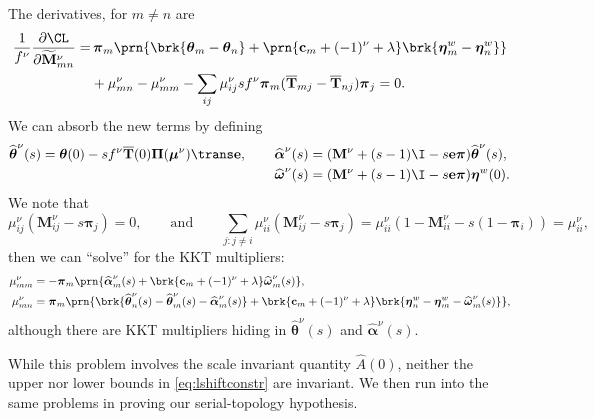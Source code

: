 \documentclass[12pt]{article}
\newcommand{\onev}{\mathbf{e}}
\newcommand{\eq}{\pib}
\newcommand{\Eq}{\boldsymbol{\Pi}}
\newcommand{\fpt}{\mathbf{T}}
\newcommand{\fptb}{\overline{\fpt}}
\newcommand{\pib}{\boldsymbol{\pi}}
\newcommand{\etw}{\boldsymbol{\eta}^w}
\newcommand{\thb}{\boldsymbol{\theta}}
\newcommand{\omb}{\boldsymbol{\omega}}
\newcommand{\alb}{\boldsymbol{\alpha}}
\newcommand{\M}{\mathbf{M}}
\newcommand{\Mh}{\widetilde{\M}}
\renewcommand{\pdiff}[2]{\frac{\partial #1}{\partial #2}}
\newcommand{\shift}[1]{\widehat{#1}}
\begin{document}
The derivatives, for $m \neq n$ are
%
\begin{equation}\label{eq:lshiftderivs}
\begin{aligned}
  \frac{1}{f^\nu} \pdiff{\CL}{\Mh^\nu_{mn}} = & \,
    \eq_m \prn{ \brk{\thb_m - \thb_n}
     + \prn{\mathbf{c}_m + (-1)^\nu + \lambda} \brk{\etw_m - \etw_n} } \\
     &+ \mu^\nu_{mn} -  \mu^\nu_{mm}
     - \sum_{ij} \mu^\nu_{ij} s f^\nu \eq_m (\fptb_{mj} - \fptb_{nj}) \eq_j
    = 0.
\end{aligned}
\end{equation}
%
We can absorb the new terms by defining
%
\begin{equation*}
\begin{aligned}
  \shift{\thb}^\nu(s) = \thb(0) - s f^\nu \fptb(0) \Eq (\boldsymbol{\mu}^\nu)\trans \onev,
  \qquad
  \shift{\alb}^\nu(s) &= (\M^\nu + (s - 1) \I - s \onev \eq) \shift{\thb}^\nu(s),
  \\
  \shift{\omb}^\nu(s) &= (\M^\nu + (s - 1) \I - s \onev \eq) \etw(0).
\end{aligned}
\end{equation*}
%
We note that
%
\begin{equation*}
  \mu^\nu_{ij} (\M^\nu_{ij} - s \eq_j) = 0,
  \qquad \text{and} \qquad
  \sum_{j: j \neq i} \mu^\nu_{ii} (\M^\nu_{ij} - s \eq_j)
      = \mu^\nu_{ii} (1 - \M^\nu_{ii} - s (1 - \eq_i)) = \mu^\nu_{ii},
\end{equation*}
%
then we can ``solve'' for the KKT multipliers:
%
\begin{equation}\label{eq:lshiftsol}
\begin{aligned}
  \mu^\nu_{mm} &= - \eq_m \prn{ \shift{\alb}^\nu_m(s) 
    + \brk{ \mathbf{c}_m + (-1)^\nu + \lambda } \shift{\omb}^\nu_m(s)
    }, \\
  \mu^\nu_{mn} &= \eq_m \prn{ 
      \brk{ \shift{\thb}^\nu_n(s) - \shift{\thb}^\nu_m(s) - \shift{\alb}^\nu_m(s) }
    + \brk{ \mathbf{c}_m + (-1)^\nu + \lambda } 
        \brk{ \etw_n - \etw_m - \shift{\omb}^\nu_m(s) }
     }, \\
\end{aligned}
\end{equation}
%
although there are KKT multipliers hiding in \(\shift{\thb}^\nu(s)\) and \(\shift{\alb}^\nu(s)\).

While this problem involves the scale invariant quantity \(\hat{A}(0)\), neither the upper nor lower bounds in \cref{eq:lshiftconstr} are invariant.
We then run into the same problems in proving our serial-topology hypothesis.
\end{document}
